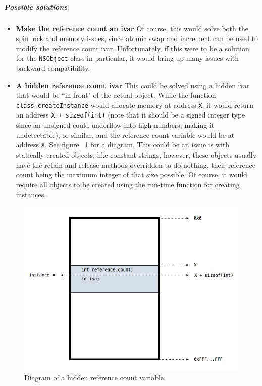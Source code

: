\subparagraph{Possible solutions}
\begin{itemize}
  \item{\bf{Make the reference count an ivar}} Of course, this would solve both the spin lock and memory issues, since atomic swap and increment can be used to modify the reference count ivar. Unfortunately, if this were to be a solution for the \verb=NSObject= class in particular, it would bring up many issues with backward compatibility.
  \item{\bf{A hidden reference count ivar}} This could be solved using a hidden ivar that would be ``in front" of the actual object. While the function \verb=class_createInstance= would allocate memory at address \verb=X=, it would return an address \verb=X + sizeof(int)= (note that it should be a signed integer type since an unsigned could underflow into high numbers, making it undetectable), or similar, and the reference count variable would be at address \verb=X=. See figure ~\ref{fig:ref_cnt_hidden_ivar} for a diagram. This could be an issue is with statically created objects, like constant strings, however, these objects usually have the retain and release methods overridden to do nothing, their reference count being the maximum integer of that size possible. Of course, it would require all objects to be created using the run-time function for creating instances.
\end{itemize}

\begin{figure}
  \includegraphics[width=\textwidth]{img/hidden_ref_cnt_var.png}
  
  \centering{}
  \caption{Diagram of a hidden reference count variable.}
  \label{fig:ref_cnt_hidden_ivar}
\end{figure}

